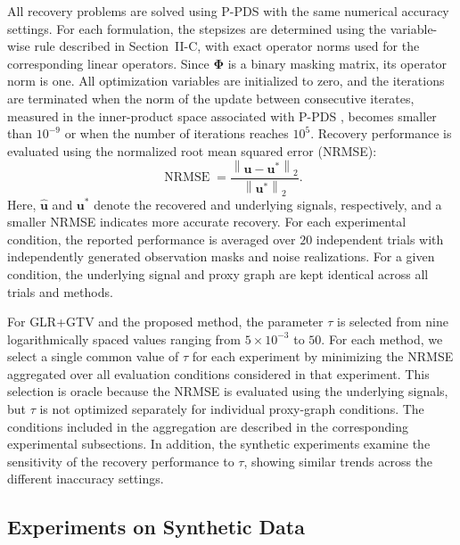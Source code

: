 All recovery problems are solved using P-PDS with the same numerical accuracy settings.
For each formulation, the stepsizes are determined using the variable-wise rule described in Section~II-C, with exact operator norms used for the corresponding linear operators.
Since $\mathbf{\Phi}$ is a binary masking matrix, its operator norm is one.
All optimization variables are initialized to zero, and the iterations are terminated when the norm of the update between consecutive iterates, measured in the inner-product space associated with P-PDS \cite{chambolle2011first}, becomes smaller than $10^{-9}$ or when the number of iterations reaches $10^{5}$.
Recovery performance is evaluated using the normalized root mean squared error (NRMSE):
\begin{equation}
\operatorname{NRMSE}
=
\frac{
\left\|
\widehat{\mathbf{u}}-\mathbf{u}^{\ast}
\right\|_2
}{
\left\|
\mathbf{u}^{\ast}
\right\|_2
}.
\label{eq:nrmse}
\end{equation}
Here, $\widehat{\mathbf{u}}$ and $\mathbf{u}^{\ast}$ denote the recovered and underlying signals, respectively, and a smaller NRMSE indicates more accurate recovery.
For each experimental condition, the reported performance is averaged over $20$ independent trials with independently generated observation masks and noise realizations.
For a given condition, the underlying signal and proxy graph are kept identical across all trials and methods.

For GLR+GTV and the proposed method, the parameter $\tau$ is selected from nine logarithmically spaced values ranging from $5\times10^{-3}$ to $50$.
For each method, we select a single common value of $\tau$ for each experiment by minimizing the NRMSE aggregated over all evaluation conditions considered in that experiment.
This selection is oracle because the NRMSE is evaluated using the underlying signals, but $\tau$ is not optimized separately for individual proxy-graph conditions.
The conditions included in the aggregation are described in the corresponding experimental subsections.
In addition, the synthetic experiments examine the sensitivity of the recovery performance to $\tau$, showing similar trends across the different inaccuracy settings.

\subsection{Experiments on Synthetic Data}

